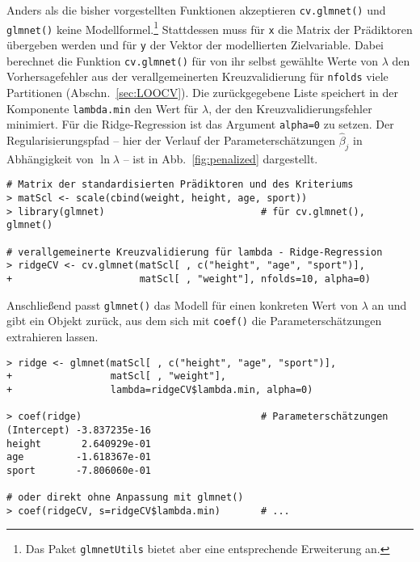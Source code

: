 Anders als die bisher vorgestellten Funktionen akzeptieren \lstinline!cv.glmnet()! und \lstinline!glmnet()! keine Modellformel.\footnote{Das Paket \lstinline!glmnetUtils! \cite{Ooi2017} bietet aber eine entsprechende Erweiterung an.} Stattdessen muss für \lstinline!x! die Matrix der Prädiktoren übergeben werden und für \lstinline!y! der Vektor der modellierten Zielvariable. Dabei berechnet die Funktion \lstinline!cv.glmnet()! für von ihr selbst gewählte Werte von $\lambda$ den Vorhersagefehler aus der verallgemeinerten Kreuzvalidierung für \lstinline!nfolds! viele Partitionen (Abschn.\ \ref{sec:LOOCV}). Die zurückgegebene Liste speichert in der Komponente \lstinline!lambda.min! den Wert für $\lambda$, der den Kreuzvalidierungsfehler minimiert. Für die Ridge-Regression ist das Argument \lstinline!alpha=0! zu setzen. Der Regularisierungspfad -- hier der Verlauf der Parameterschätzungen $\hat{\beta}_{j}$ in Abhängigkeit von $\ln \lambda$ -- ist in Abb.\ \ref{fig:penalized} dargestellt.
\begin{lstlisting}
# Matrix der standardisierten Prädiktoren und des Kriteriums
> matScl <- scale(cbind(weight, height, age, sport))
> library(glmnet)                           # für cv.glmnet(), glmnet()

# verallgemeinerte Kreuzvalidierung für lambda - Ridge-Regression
> ridgeCV <- cv.glmnet(matScl[ , c("height", "age", "sport")],
+                      matScl[ , "weight"], nfolds=10, alpha=0)
\end{lstlisting}

Anschließend passt \lstinline!glmnet()! das Modell für einen konkreten Wert von $\lambda$ an und gibt ein Objekt zurück, aus dem sich mit \lstinline!coef()! die Parameterschätzungen extrahieren lassen.
\begin{lstlisting}
> ridge <- glmnet(matScl[ , c("height", "age", "sport")],
+                 matScl[ , "weight"],
+                 lambda=ridgeCV$lambda.min, alpha=0)

> coef(ridge)                               # Parameterschätzungen
(Intercept) -3.837235e-16
height       2.640929e-01
age         -1.618367e-01
sport       -7.806060e-01

# oder direkt ohne Anpassung mit glmnet()
> coef(ridgeCV, s=ridgeCV$lambda.min)       # ...
\end{lstlisting}


